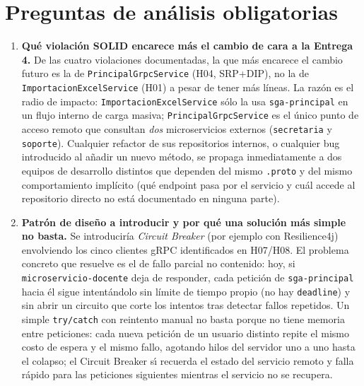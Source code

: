 \documentclass[11pt,a4paper]{article}
\begin{document}
    \section{Preguntas de an\'alisis obligatorias}
    \label{sec:preguntas}

    \begin{enumerate}[leftmargin=*,label=\textbf{P\arabic*.}]
\item \textbf{Qu\'e violaci\'on SOLID encarece m\'as el cambio de cara a la Entrega 4.}
De las cuatro violaciones documentadas, la que m\'as encarece el cambio futuro es la de \texttt{PrincipalGrpcService} (H04, SRP+DIP), no la de \texttt{ImportacionExcelService} (H01) a pesar de tener m\'as l\'ineas. La raz\'on es el radio de impacto: \texttt{ImportacionExcelService} s\'olo la usa \texttt{sga-principal} en un flujo interno de carga masiva; \texttt{PrincipalGrpcService} es el \'unico punto de acceso remoto que consultan \emph{dos} microservicios externos (\texttt{secretaria} y \texttt{soporte}). Cualquier refactor de sus repositorios internos, o cualquier bug introducido al a\~nadir un nuevo m\'etodo, se propaga inmediatamente a dos equipos de desarrollo distintos que dependen del mismo \texttt{.proto} y del mismo comportamiento impl\'icito (qu\'e endpoint pasa por el servicio y cu\'al accede al repositorio directo no est\'a documentado en ninguna parte).

\item \textbf{Patr\'on de dise\~no a introducir y por qu\'e una soluci\'on m\'as simple no basta.}
Se introducir\'ia \emph{Circuit Breaker} (por ejemplo con Resilience4j) envolviendo los cinco clientes gRPC identificados en H07/H08. El problema concreto que resuelve es el de fallo parcial no contenido: hoy, si \texttt{microservicio-docente} deja de responder, cada petici\'on de \texttt{sga-principal} hacia \'el sigue intent\'andolo sin l\'imite de tiempo propio (no hay \texttt{deadline}) y sin abrir un circuito que corte los intentos tras detectar fallos repetidos. Un simple \texttt{try/catch} con reintento manual no basta porque no tiene memoria entre peticiones: cada nueva petici\'on de un usuario distinto repite el mismo costo de espera y el mismo fallo, agotando hilos del servidor uno a uno hasta el colapso; el Circuit Breaker s\'{\i} recuerda el estado del servicio remoto y falla r\'apido para las peticiones siguientes mientras el servicio no se recupera.


\end{enumerate}
\end{document}
